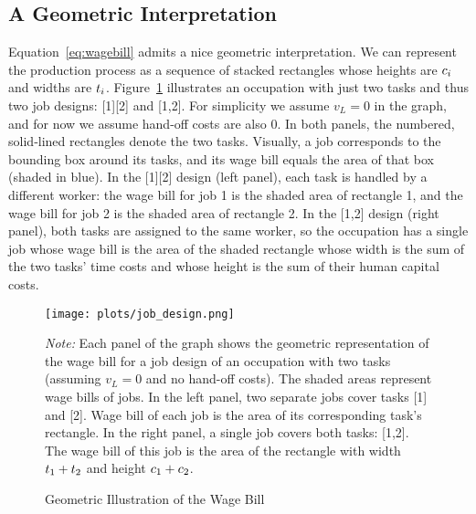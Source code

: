 \documentclass{article}
\theoremstyle{plain}
\theoremstyle{plain}
\begin{document}
\subsection{A Geometric Interpretation}

Equation~\ref{eq:wagebill} admits a nice geometric interpretation.  
We can represent the production process as a sequence of stacked rectangles whose heights are $c_{i}$ and widths are $t_{i}$.  
Figure~\ref{fig:wage_bill} illustrates an occupation with just two tasks and thus two job designs: [1][2] and [1,2].
For simplicity we assume $v_L=0$ in the graph, and for now we assume hand-off costs are also $0$.
In both panels, the numbered, solid‐lined rectangles denote the two tasks.
Visually, a job corresponds to the bounding box around its tasks, and its wage bill equals the area of that box (shaded in blue).
In the [1][2] design (left panel), each task is handled by a different worker: the wage bill for job 1 is the shaded area of rectangle 1, and the wage bill for job 2 is the shaded area of rectangle 2.  
In the [1,2] design (right panel), both tasks are assigned to the same worker, so the occupation has a single job whose wage bill is the area of the shaded rectangle whose width is the sum of the two tasks’ time costs and whose height is the sum of their human capital costs.  
\begin{figure}[h!]
  \caption{Geometric Illustration of the Wage Bill} 
  \label{fig:wage_bill}
  \begin{center}
    \texttt{[image: plots/job\_design.png]}
  \end{center}
  \begin{footnotesize}
    \emph{Note:} Each panel of the graph shows the geometric representation of the wage bill for a job design of an occupation with two tasks (assuming $v_L=0$ and no hand-off costs).  
    The shaded areas represent wage bills of jobs. 
    In the left panel, two separate jobs cover tasks [1] and [2].
    Wage bill of each job is the area of its corresponding task's rectangle.
    In the right panel, a single job covers both tasks: [1,2].
    The wage bill of this job is the area of the rectangle with width $t_{1}+t_{2}$ and height $c_{1}+c_{2}$.
  \end{footnotesize}
\end{figure}
\end{document}
